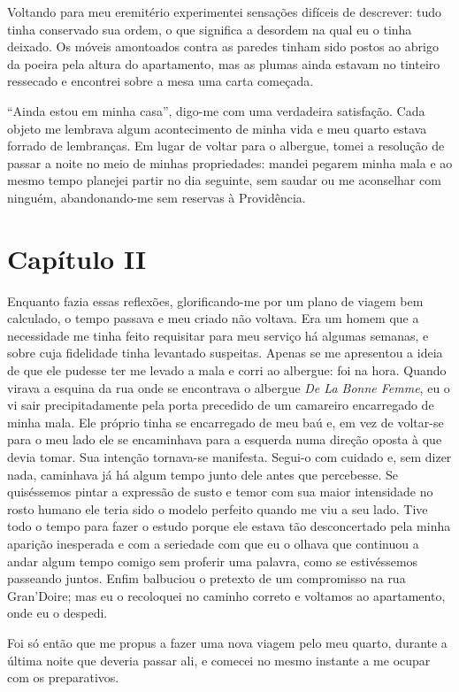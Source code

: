 Voltando para meu eremitério experimentei sensações difíceis de
descrever: tudo tinha conservado sua ordem, o que significa a desordem
na qual eu o tinha deixado. Os móveis amontoados contra as paredes
tinham sido postos ao abrigo da poeira pela altura do apartamento, mas
as plumas ainda estavam no tinteiro ressecado e encontrei sobre a mesa
uma carta começada.

``Ainda estou em minha casa'', digo-me com uma verdadeira satisfação. Cada
objeto me lembrava algum acontecimento de minha vida e meu quarto
estava forrado de lembranças. Em lugar de voltar para o albergue, tomei
a resolução de passar a noite no meio de minhas propriedades: mandei
pegarem minha mala e ao mesmo tempo planejei partir no dia seguinte,
sem saudar ou me aconselhar com ninguém, abandonando-me sem reservas à
Providência.

\section{Capítulo II}

 Enquanto fazia essas reflexões, glorificando-me por um plano de viagem
bem calculado, o tempo passava e meu criado não voltava. Era um homem
que a necessidade me tinha feito requisitar para meu serviço há algumas
semanas, e sobre cuja fidelidade tinha levantado suspeitas. Apenas se
me apresentou a ideia de que ele pudesse ter me levado a mala e corri
ao albergue: foi na hora. Quando virava a esquina da rua onde se
encontrava o albergue \textit{De La Bonne Femme}, eu o vi sair
precipitadamente pela porta precedido de um camareiro encarregado de
minha mala. Ele próprio tinha se encarregado de meu baú e, em vez de
voltar-se para o meu lado ele se encaminhava para a esquerda numa
direção oposta à que devia tomar. Sua intenção tornava-se manifesta.
Segui-o com cuidado e, sem dizer nada, caminhava já há algum tempo
junto dele antes que percebesse. Se quiséssemos pintar a expressão de
susto e temor com sua maior intensidade no rosto humano ele teria sido
o modelo perfeito quando me viu a seu lado. Tive todo o tempo para
fazer o estudo porque ele estava tão desconcertado pela minha aparição
inesperada e com a seriedade com que eu o olhava que continuou a andar
algum tempo comigo sem proferir uma palavra, como se estivéssemos
passeando juntos. Enfim balbuciou o pretexto de um compromisso na rua
Gran’Doire; mas eu o recoloquei no caminho correto e voltamos ao
apartamento, onde eu o despedi.

 Foi só então que me propus a fazer uma nova viagem pelo meu quarto,
durante a última noite que deveria passar ali, e comecei no mesmo
instante a me ocupar com os preparativos. 

